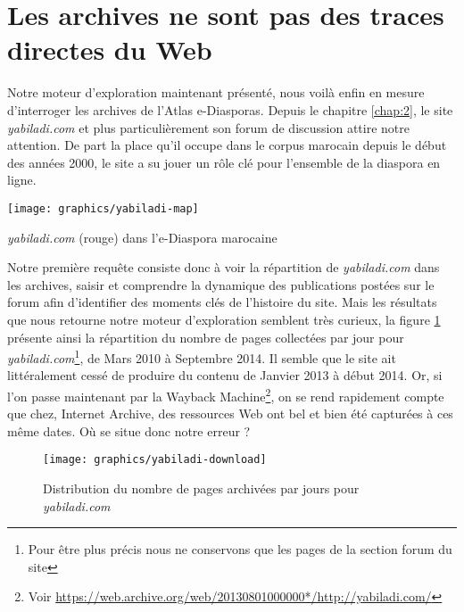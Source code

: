 \documentclass[symmetric,justified,marginals=raggedouter]{tufte-book}
\begin{document}
\section{Les archives ne sont pas des traces directes du Web}
\label{sec:4_legacy}

\noindent Notre moteur d'exploration maintenant présenté, nous voilà enfin en mesure d'interroger les archives de l'Atlas e-Diasporas. Depuis le chapitre \ref{chap:2}, le site \textit{yabiladi.com} et plus particulièrement son forum de discussion attire notre attention. De part la place qu'il occupe dans le corpus marocain depuis le début des années 2000, le site a su jouer un rôle clé pour l'ensemble de la diaspora en ligne. 

\begin{marginfigure}%
  \texttt{[image: graphics/yabiladi-map]}
  \vspace*{0.2cm}  
  \caption{\textit{yabiladi.com} (rouge) dans l'e-Diaspora marocaine}
  \label{fig:yabiladi-map}
\end{marginfigure} 

Notre première requête consiste donc à voir la répartition de \textit{yabiladi.com} dans les archives, saisir et comprendre la dynamique des publications postées sur le forum afin d'identifier des moments clés de l'histoire du site. Mais les résultats que nous retourne notre moteur d'exploration semblent très curieux, la figure \ref{fig:yabiladi-download} présente ainsi la répartition du nombre de pages collectées par jour pour \textit{yabiladi.com}\footnote{Pour être plus précis nous ne conservons que les pages de la section forum du site}, de Mars 2010 à Septembre 2014. Il semble que le site ait littéralement cessé de produire du contenu de Janvier 2013 à début 2014. Or, si l'on passe maintenant par la Wayback Machine\footnote{Voir \url{https://web.archive.org/web/20130801000000*/http://yabiladi.com/}}, on se rend rapidement compte que chez, Internet Archive, des ressources Web ont bel et bien été capturées à ces même dates. Où se situe donc notre erreur ?

\begin{figure}%
  \texttt{[image: graphics/yabiladi-download]}
  \caption{Distribution du nombre de pages archivées par jours pour \textit{yabiladi.com}}
  \label{fig:yabiladi-download}
\end{figure}
\end{document}
